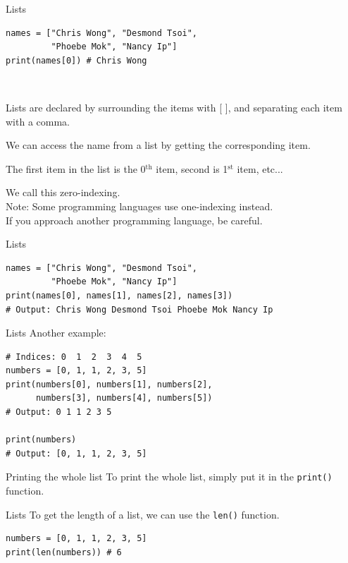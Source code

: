 \documentclass[dvipsnames, svgnames, x11names, handout]{beamer}
\begin{document}
\begin{frame}[fragile]{Lists}
\begin{verbatim}
names = ["Chris Wong", "Desmond Tsoi",
         "Phoebe Mok", "Nancy Ip"]
print(names[0]) # Chris Wong
\end{verbatim}

\

Lists are declared by surrounding the items with [ ], and separating each item with a comma.

We can access the name from a list by getting the corresponding item.

The first item in the list is the 0$^{\text{th}}$ item, second is 1$^{\text{st}}$ item, etc... 

We call this zero-indexing.\\

{\tiny Note: Some programming languages use one-indexing instead.\\[-1em]

\hspace{2.5em} If you approach another programming language, be careful.}
\end{frame}

\begin{frame}[fragile]{Lists}
\begin{verbatim}
names = ["Chris Wong", "Desmond Tsoi",
         "Phoebe Mok", "Nancy Ip"]
print(names[0], names[1], names[2], names[3]) 
# Output: Chris Wong Desmond Tsoi Phoebe Mok Nancy Ip
\end{verbatim}
\end{frame}

\begin{frame}[fragile]{Lists}
Another example:
\begin{verbatim}
# Indices: 0  1  2  3  4  5
numbers = [0, 1, 1, 2, 3, 5]
print(numbers[0], numbers[1], numbers[2],
      numbers[3], numbers[4], numbers[5]) 
# Output: 0 1 1 2 3 5

print(numbers)
# Output: [0, 1, 1, 2, 3, 5]
\end{verbatim}

\begin{block}{Printing the whole list}
To print the whole list, simply put it in the \texttt{print()} function.
\end{block}
\end{frame}

\begin{frame}[fragile]{Lists}
To get the length of a list, we can use the \texttt{len()} function. \pause
\begin{verbatim}
numbers = [0, 1, 1, 2, 3, 5]
print(len(numbers)) # 6
\end{verbatim}
\end{frame}
\end{document}
